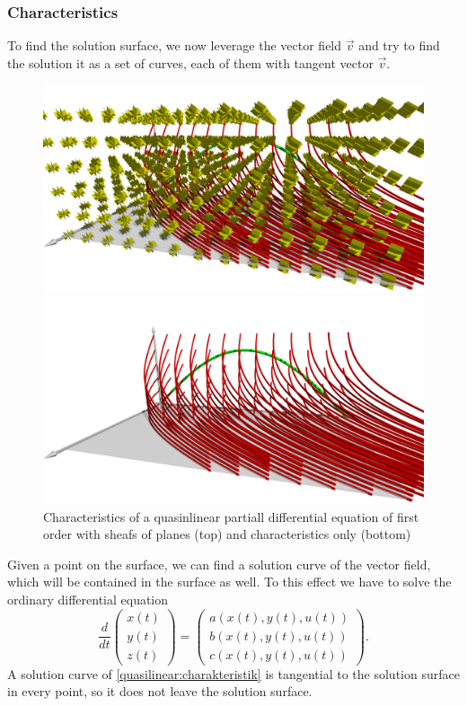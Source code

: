 \subsubsection{Characteristics}
To find the solution surface, we now leverage the vector field $\vec{v}$
and try to find the solution it as a set of curves, each of them with
tangent vector $\vec{v}$.
\begin{figure}
\begin{center}
\includegraphics[width=\hsize]{../common/3d/chrpl.jpg}
\end{center}
\begin{center}
\includegraphics[width=\hsize]{../common/3d/chr.jpg}
\end{center}
\caption{Characteristics of a quasinlinear partiall differential equation
of first order with sheafs of planes (top) and characteristics only (bottom)
\label{geometrie:charekeristiken-mit-buescheln}}
\end{figure}
Given a point on the surface, we can find a solution curve of the vector
field, which will be contained in the surface as well.
To this effect we have to solve the ordinary differential equation
\begin{equation}
\frac{d}{dt}\begin{pmatrix}x(t)\\y(t)\\z(t)\end{pmatrix}
=
\begin{pmatrix}
a(x(t),y(t),u(t))\\b(x(t),y(t),u(t))\\c(x(t),y(t),u(t))
\end{pmatrix}.
\label{quasilinear:charakteristik}
\end{equation}
A solution curve of
\eqref{quasilinear:charakteristik}
is tangential to the solution surface in every point, so it does not
leave the solution surface.

